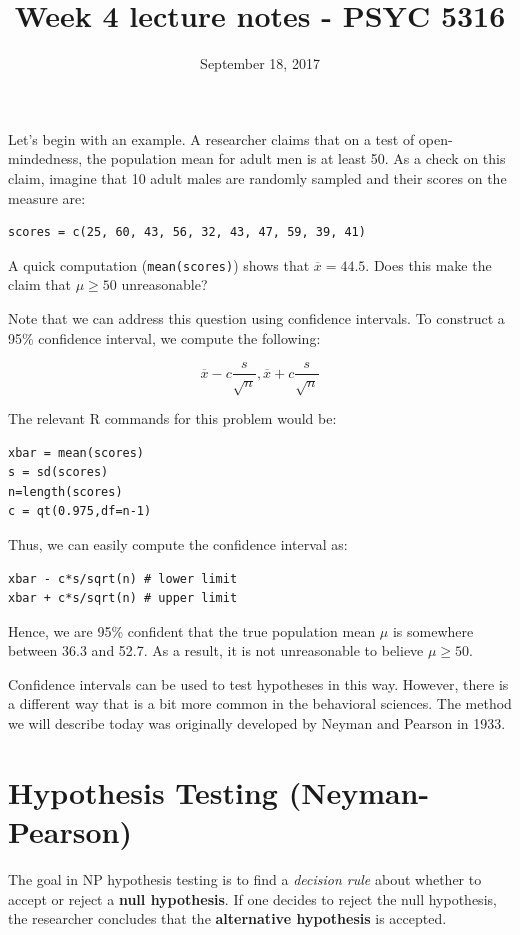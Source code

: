\documentclass[11pt]{article}
\date{September 18, 2017}
\title{Week 4 lecture notes - PSYC 5316}
\begin{document}
\maketitle
Let's begin with an example.  A researcher claims that on a test of open-mindedness, the population mean for adult men is at least 50.  As a check on this claim, imagine that 10 adult males are randomly sampled and their scores on the measure are:

\begin{verbatim}
scores = c(25, 60, 43, 56, 32, 43, 47, 59, 39, 41)
\end{verbatim}

A quick computation (\texttt{mean(scores)}) shows that $\overline{x}=44.5$.  Does this make the claim that $\mu \geq 50$ unreasonable?

Note that we can address this question using confidence intervals.  To construct a 95\% confidence interval, we compute the following:

\[
\overline{x}-c\frac{s}{\sqrt{n}}, \overline{x}+c\frac{s}{\sqrt{n}}
\]

The relevant R commands for this problem would be:

\begin{verbatim}
xbar = mean(scores)
s = sd(scores)
n=length(scores)
c = qt(0.975,df=n-1)
\end{verbatim}

Thus, we can easily compute the confidence interval as:

\begin{verbatim}
xbar - c*s/sqrt(n) # lower limit
xbar + c*s/sqrt(n) # upper limit
\end{verbatim}

Hence, we are 95\% confident that the true population mean $\mu$ is somewhere between 36.3 and 52.7.  As a result, it is not unreasonable to believe $\mu\geq 50$.

Confidence intervals can be used to test hypotheses in this way.  However, there is a different way that is a bit more common in the behavioral sciences.  The method we will describe today was originally developed by Neyman and Pearson in 1933.

\section*{Hypothesis Testing (Neyman-Pearson)}
\label{sec-1}

The goal in NP hypothesis testing is to find a \emph{decision rule} about whether to accept or reject a \textbf{null hypothesis}.  If one decides to reject the null hypothesis, the researcher concludes that the \textbf{alternative hypothesis} is accepted.
\end{document}
